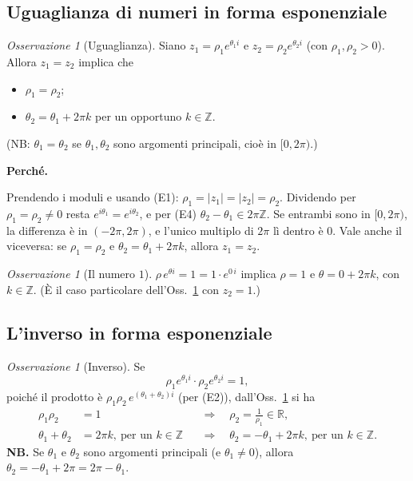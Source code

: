 \documentclass[11pt,a4paper]{article}
\newcommand{\RR}{\mathbb{R}}
\newcommand{\ZZ}{\mathbb{Z}}
\theoremstyle{plain}
\theoremstyle{definition}
\theoremstyle{remark}
\newtheorem{oss}[prop]{Osservazione}
\begin{document}
\subsection{Uguaglianza di numeri in forma esponenziale}

\begin{oss}[Uguaglianza]\label{oss:uguaglianza}
Siano $z_1=\rho_1e^{\theta_1i}$ e $z_2=\rho_2e^{\theta_2i}$ (con $\rho_1,\rho_2>0$). Allora $z_1=z_2$ implica che
\begin{itemize}
  \item $\rho_1=\rho_2$;
  \item $\theta_2=\theta_1+2\pi k$ per un opportuno $k\in\ZZ$.
\end{itemize}
(NB: $\theta_1=\theta_2$ se $\theta_1,\theta_2$ sono argomenti principali, cioè in $[0,2\pi)$.)
\end{oss}

\par\medskip
\noindent\textbf{Perché.}\par

Prendendo i moduli e usando (E1): $\rho_1=|z_1|=|z_2|=\rho_2$. Dividendo per $\rho_1=\rho_2\neq0$ resta
$e^{i\theta_1}=e^{i\theta_2}$, e per (E4) $\theta_2-\theta_1\in2\pi\ZZ$.
Se entrambi sono in $[0,2\pi)$, la differenza è in $(-2\pi,2\pi)$, e l'unico multiplo di $2\pi$ lì dentro è $0$.
Vale anche il viceversa: se $\rho_1=\rho_2$ e $\theta_2=\theta_1+2\pi k$, allora $z_1=z_2$.
\par\medskip

\begin{oss}[Il numero $1$]\label{oss:uno}
$\rho\,e^{\theta i}=1=1\cdot e^{0\,i}$ implica $\rho=1$ e $\theta=0+2\pi k$, con $k\in\ZZ$.
(È il caso particolare dell'Oss.~\ref{oss:uguaglianza} con $z_2=1$.)
\end{oss}

\subsection{L'inverso in forma esponenziale}

\begin{oss}[Inverso]\label{oss:inverso}
Se
\[
  \rho_1e^{\theta_1i}\cdot\rho_2e^{\theta_2i}=1,
\]
poiché il prodotto è $\rho_1\rho_2\,e^{(\theta_1+\theta_2)i}$ (per (E2)), dall'Oss.~\ref{oss:uno} si ha
\begin{align*}
  \rho_1\rho_2&=1 &&\Longrightarrow\quad \rho_2=\frac1{\rho_1}\in\RR,\\
  \theta_1+\theta_2&=2\pi k,\ \text{per un }k\in\ZZ &&\Longrightarrow\quad \theta_2=-\theta_1+2\pi k,\ \text{per un }k\in\ZZ.
\end{align*}
\textbf{NB.} Se $\theta_1$ e $\theta_2$ sono argomenti principali (e $\theta_1\neq0$), allora $\theta_2=-\theta_1+2\pi=2\pi-\theta_1$.
\end{oss}
\end{document}
